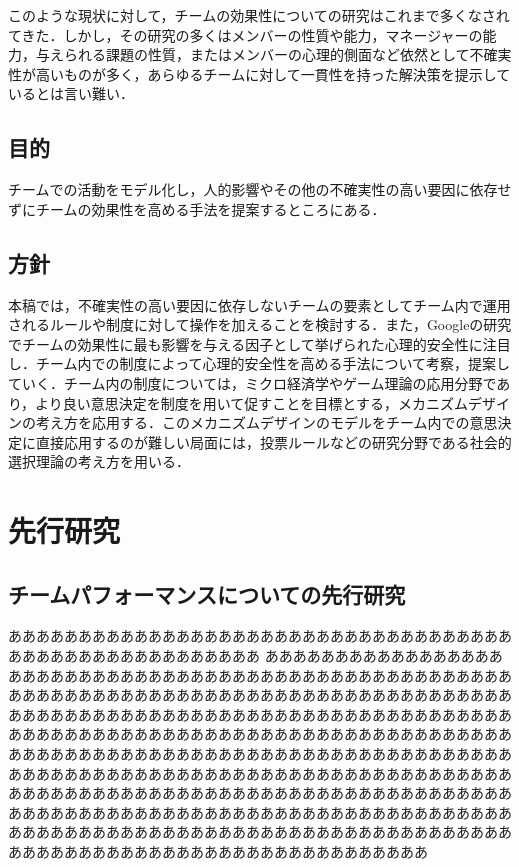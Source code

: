 \documentclass[a4paper, 11pt]{jsarticle}
\begin{document}
このような現状に対して，チームの効果性についての研究はこれまで多くなされてきた．しかし，その研究の多くはメンバーの性質や能力，マネージャーの能力，与えられる課題の性質，またはメンバーの心理的側面など依然として不確実性が高いものが多く，あらゆるチームに対して一貫性を持った解決策を提示しているとは言い難い．
\subsection{目的}
チームでの活動をモデル化し，人的影響やその他の不確実性の高い要因に依存せずにチームの効果性を高める手法を提案するところにある．

\subsection{方針}
本稿では，不確実性の高い要因に依存しないチームの要素としてチーム内で運用されるルールや制度に対して操作を加えることを検討する．また，Googleの研究でチームの効果性に最も影響を与える因子として挙げられた心理的安全性に注目し．チーム内での制度によって心理的安全性を高める手法について考察，提案していく．チーム内の制度については，ミクロ経済学やゲーム理論の応用分野であり，より良い意思決定を制度を用いて促すことを目標とする，メカニズムデザインの考え方を応用する．このメカニズムデザインのモデルをチーム内での意思決定に直接応用するのが難しい局面には，投票ルールなどの研究分野である社会的選択理論の考え方を用いる．

\section{先行研究}
\subsection{チームパフォーマンスについての先行研究}
ああああああああああああああああああああああああああああああああああああああああああああああああああああああ あああああああああああああああああああああああああああああああああああああああああああああああああああああああああああああああああああああああああああああああああああああああああああああああああああああああああああああああああああああああああああああああああああああああああああああああああああああああああああああああああああああああああああああああああああああああああああああああああああああああああああああああああああああああああああああああああああああああああああああああああああああああああああああああああああああああああああああああああああああああああああああああああああああああああああああああああああああああああああああああああああああああああああああああああああああああああああああああああああああああああああああああああああ
\end{document}
